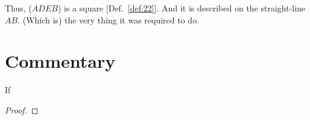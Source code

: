 Thus, ($ADEB$) is a square [Def.~\ref{def:22}]. And it is described on the straight-line $AB$. (Which is) the very thing it was required to do.


\section*{Commentary}

\begin{proposition}\label{proposition_46}\leanok
    If
\end{proposition}
\begin{proof}
    \leanok
\end{proof}
